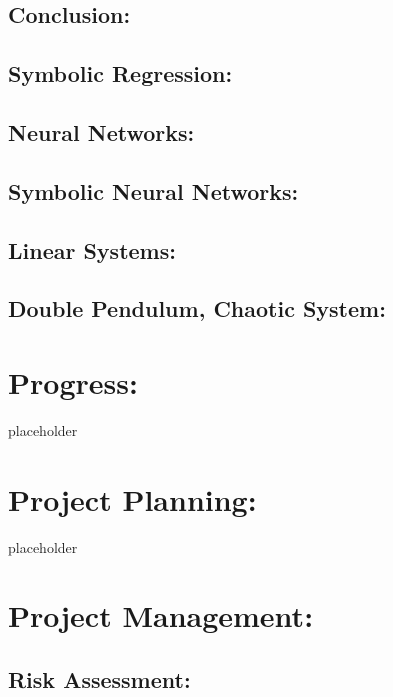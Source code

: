 \documentclass{article}
\begin{document}
\subsection{ Conclusion: }


\subsection{Symbolic Regression: }

\subsection{Neural Networks: }

\subsection{Symbolic Neural Networks: }

\subsection{Linear Systems: }

\subsection{Double Pendulum, Chaotic System: }

\section{Progress: }

placeholder 

\section{Project Planning: }

placeholder 

 

\section{ Project Management: }

\subsection{Risk Assessment: }
\end{document}
